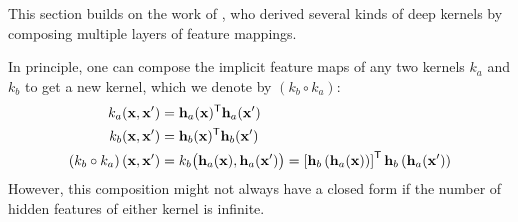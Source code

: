 \documentclass{article} %
\begin{document}
This section builds on the work of \citet{cho2009kernel}, who derived several kinds of deep kernels by composing multiple layers of feature mappings.

 


In principle, one can compose the implicit feature maps of any two kernels $k_a$ and $k_b$ to get a new kernel, which we denote by $\left( k_b \circ k_a \right)$:
%
\begin{align}
k_a({\bf{x}}, {\bf{x}}') & = {\bf{h}}_a({\bf{x}}) ^{\mathsf{T}} {\bf{h}}_a({\bf{x}}') \\
k_b({\bf{x}}, {\bf{x}}') & = {\bf{h}}_b({\bf{x}}) ^{\mathsf{T}} {\bf{h}}_b({\bf{x}}') \\
\left( k_b \circ k_a \right)({\bf{x}}, {\bf{x}}') & = k_b \big({\bf{h}}_a({\bf{x}}), {\bf{h}}_a({\bf{x}}') \big) 
 = \left[ {\bf{h}}_b \left( {\bf{h}}_a({\bf{x}}) \right)\right] ^{\mathsf{T}} {\bf{h}}_b \left({\bf{h}}_a({\bf{x}}') \right)
\end{align}
%
However, this composition might not always have a closed form if the number of hidden features of either kernel is infinite.
\end{document}
